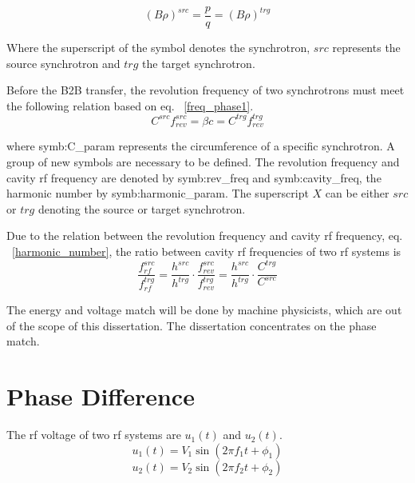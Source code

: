 \begin{equation}
	\label{eq:rigidity}
	(B\rho)^{\mathit{src}} =\frac{p}{q}=(B\rho)^{\mathit{trg}}
\end{equation}

Where the superscript of the symbol denotes the synchrotron, $\mathit{src}$ represents the source synchrotron and $\mathit{trg}$ the target synchrotron. 

Before the B2B transfer, the revolution frequency of two synchrotrons must meet the following relation based on eq. ~\ref{freq_phase1}. 
\begin{equation}
	C^{\mathit{src}}f_{rev}^{\mathit{src}} = \beta c=C^{\mathit{trg}}f_{rev}^{\mathit{trg}}
\end{equation}

where \gls{symb:C_param} represents the circumference of a specific synchrotron. A group of new symbols are necessary to be defined. The revolution frequency and cavity rf frequency are denoted by \gls{symb:rev_freq} and \gls{symb:cavity_freq}, the harmonic number by \gls{symb:harmonic_param}. The superscript $X$ can be either $src$ or $trg$ denoting the source or target synchrotron. 

Due to the relation between the revolution frequency and cavity rf frequency, eq. ~\ref{harmonic_number}, the ratio between cavity rf frequencies of two rf systems is
\begin{equation}
	\frac{f_{rf}^{\mathit{src}}}{f_{rf}^{\mathit{trg}}}=\frac{h^{\mathit{src}}}{h^{\mathit{trg}}}\cdot\frac{f_{rev}^{\mathit{src}}}{f_{rev}^{\mathit{trg}}}=\frac{h^{\mathit{src}}}{h^{\mathit{trg}}}\cdot \frac{C^{\mathit{trg}}}{C^{\mathit{src}}}
\end{equation}

The energy and voltage match will be done by machine physicists, which are out of the scope of this dissertation. The dissertation concentrates on the phase match.
\section{Phase Difference}
\label{match}
The rf voltage of two rf systems are $u_1(t)$ and $u_2(t)$.
\begin{equation}
\label{rf_freq1}
	u_1(t)=V_1\sin(2\pi f_1t+\phi_1)
\end{equation}
\begin{equation}
\label{rf_freq2}
	u_2(t)=V_2\sin(2\pi f_2t+\phi_2)
\end{equation}


